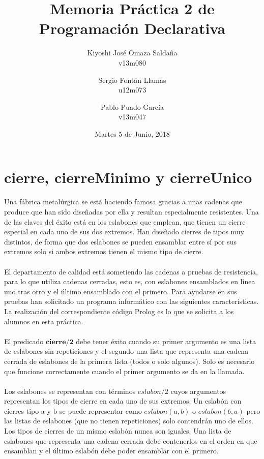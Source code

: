\documentclass[11pt, a4paper]{article}
\title{\Huge Memoria Práctica 2 de Programación Declarativa}
\date{Martes 5 de Junio, 2018}
\author{Kiyoshi José Omaza Saldaña\\ v13m080
\and Sergio Fontán Llamas\\ u12m073
\and Pablo Puado García\\ v13m047}
\begin{document}
\begin{titlepage}
\maketitle
\end{titlepage}

\tableofcontents
\newpage
{}
\section{cierre, cierreMinimo  y  cierreUnico}
Una fábrica metalúrgica se está haciendo famosa gracias a unas cadenas que produce que han sido diseñadas por ella y resultan especialmente resistentes. Una de las claves del éxito está en los eslabones que emplean, que tienen un cierre especial en cada uno de sus dos extremos. Han diseñado cierres de tipos muy distintos, de forma que dos eslabones se pueden ensamblar entre sí por sus extremos solo si ambos extremos tienen el mismo tipo de cierre.\\\\
El departamento de calidad está sometiendo las cadenas a pruebas de resistencia, para lo que utiliza cadenas cerradas, esto es, con eslabones ensamblados en línea uno tras otro y el último ensamblado con el primero. Para ayudarse en sus pruebas han solicitado un programa informático con las siguientes características. La realización del correspondiente código Prolog es lo que se solicita a los alumnos en esta práctica.\\\\
El predicado $\textbf{cierre/2}$ debe tener éxito cuando su primer argumento es una lista de eslabones sin repeticiones y el segundo una lista que representa una cadena cerrada de eslabones de la primera lista (todos o solo algunos). Solo es necesario que funcione correctamente cuando el primer argumento se da en la llamada.\\\\
Los eslabones se representan con términos $eslabon/2$ cuyos argumentos representan los tipos de cierre en cada uno de sus extremos. Un eslabón con cierres tipo a y b se puede representar como $eslabon(a,b)$ o $eslabon(b,a)$ pero las listas de eslabones (que no tienen repeticiones) solo contendrán uno de ellos. Los tipos de cierres de un mismo eslabón nunca son iguales. Una lista de eslabones que representa una cadena cerrada debe contenerlos en el orden en que ensamblan y el último eslabón debe poder ensamblar con el primero.\\\\
\end{document}
